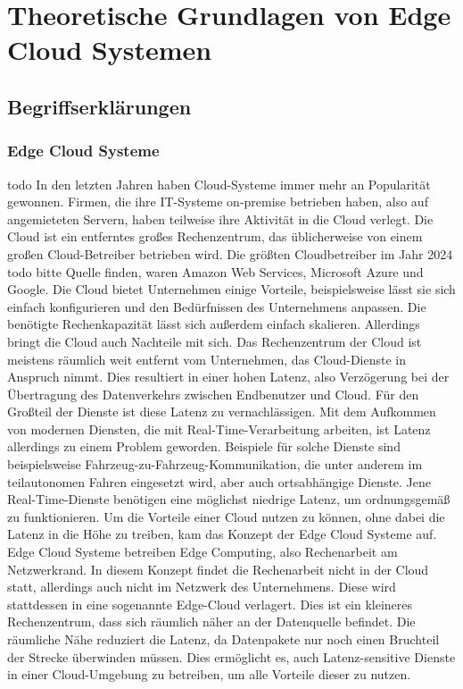 \newpage
\section{Theoretische Grundlagen von Edge Cloud Systemen} \label{infos}


\subsection{Begriffserklärungen}





\subsubsection{Edge Cloud Systeme}
todo
In den letzten Jahren haben Cloud-Systeme immer mehr an Popularität gewonnen. Firmen, die ihre \ac{IT}-Systeme on-premise betrieben haben, also auf angemieteten Servern, haben teilweise ihre Aktivität in die Cloud verlegt. 
Die Cloud ist ein entferntes großes Rechenzentrum, das üblicherweise von einem großen Cloud-Betreiber betrieben wird. Die größten Cloudbetreiber im Jahr 2024 todo bitte Quelle finden, waren Amazon Web Services, 
Microsoft Azure und Google. Die Cloud bietet Unternehmen einige Vorteile, beispielsweise lässt sie sich einfach konfigurieren und den Bedürfnissen des Unternehmens anpassen. 
Die benötigte Rechenkapazität lässt sich außerdem einfach skalieren. Allerdings bringt die Cloud auch Nachteile mit sich. Das Rechenzentrum der Cloud ist meistens räumlich weit entfernt vom Unternehmen, das Cloud-Dienste in Anspruch nimmt. 
Dies resultiert in einer hohen Latenz, also Verzögerung bei der Übertragung des Datenverkehrs zwischen Endbenutzer und Cloud. Für den Großteil der Dienste ist diese Latenz zu vernachlässigen. 
Mit dem Aufkommen von modernen Diensten, die mit Real-Time-Verarbeitung arbeiten, ist Latenz allerdings zu einem Problem geworden. Beispiele für solche Dienste sind beispielsweise Fahrzeug-zu-Fahrzeug-Kommunikation, 
die unter anderem im teilautonomen Fahren eingesetzt wird, aber auch ortsabhängige Dienste. Jene Real-Time-Dienste benötigen eine möglichst niedrige Latenz, um ordnungsgemäß zu funktionieren. 
Um die Vorteile einer Cloud nutzen zu können, ohne dabei die Latenz in die Höhe zu treiben, kam das Konzept der Edge Cloud Systeme auf. Edge Cloud Systeme betreiben Edge Computing, also Rechenarbeit am Netzwerkrand. 
In diesem Konzept findet die Rechenarbeit nicht in der Cloud statt, allerdings auch nicht im Netzwerk des Unternehmens. Diese wird stattdessen in eine sogenannte Edge-Cloud verlagert. 
Dies ist ein kleineres Rechenzentrum, dass sich räumlich näher an der Datenquelle befindet. Die räumliche Nähe reduziert die Latenz, da Datenpakete nur noch einen Bruchteil der Strecke überwinden müssen. 
Dies ermöglicht es, auch Latenz-sensitive Dienste in einer Cloud-Umgebung zu betreiben, um alle Vorteile dieser zu nutzen.


